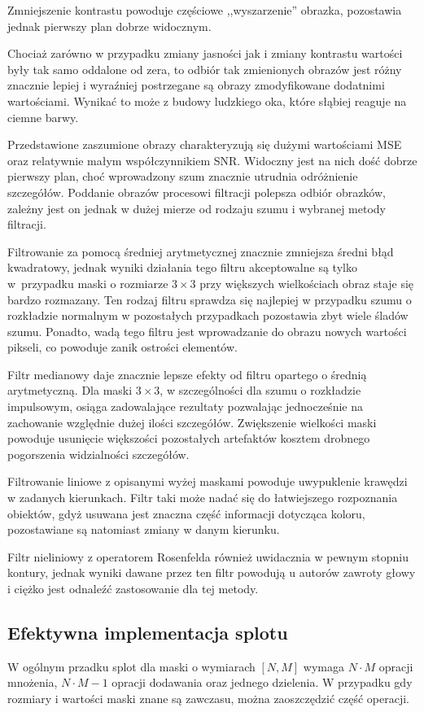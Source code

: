 \documentclass{classrep}
\begin{document}
Zmniejszenie kontrastu powoduje częściowe ,,wyszarzenie'' obrazka, pozostawia jednak pierwszy plan dobrze widocznym.

Chociaż zarówno w przypadku zmiany jasności jak i zmiany kontrastu wartości były tak samo oddalone od zera, to odbiór tak zmienionych obrazów jest różny \ppauza znacznie lepiej i wyraźniej postrzegane są obrazy zmodyfikowane dodatnimi wartościami. Wynikać to może z budowy ludzkiego oka, które słąbiej reaguje na ciemne barwy.

Przedstawione zaszumione obrazy charakteryzują się dużymi wartościami MSE oraz relatywnie małym współczynnikiem SNR. Widoczny jest na nich dość dobrze pierwszy plan, choć wprowadzony szum znacznie utrudnia odróżnienie szczegółów. Poddanie obrazów procesowi filtracji polepsza odbiór obrazków, zależny jest on jednak w dużej mierze od rodzaju szumu i wybranej metody filtracji.

Filtrowanie za pomocą średniej arytmetycznej znacznie zmniejsza średni błąd kwadratowy, jednak wyniki działania tego filtru akceptowalne są tylko w~przypadku maski o rozmiarze $3 \times 3$ \ppauza przy większych wielkościach obraz staje się bardzo rozmazany. Ten rodzaj filtru sprawdza się najlepiej w przypadku szumu o rozkładzie normalnym \ppauza w pozostałych przypadkach pozostawia zbyt wiele śladów szumu. Ponadto, wadą tego filtru jest wprowadzanie do obrazu nowych wartości pikseli, co powoduje zanik ostrości elementów.

Filtr medianowy daje znacznie lepsze efekty od filtru opartego o średnią arytmetyczną. Dla maski $3 \times 3$, w szczególności dla szumu o rozkładzie impulsowym, osiąga zadowalające rezultaty pozwalając jednocześnie na zachowanie względnie dużej ilości szczegółów. Zwiększenie wielkości maski powoduje usunięcie większości pozostałych artefaktów kosztem drobnego pogorszenia widzialności szczegółów.

Filtrowanie liniowe z opisanymi wyżej maskami powoduje uwypuklenie krawędzi w zadanych kierunkach. Filtr taki może nadać się do łatwiejszego rozpoznania obiektów, gdyż usuwana jest znaczna część informacji dotycząca koloru, pozostawiane są natomiast zmiany w danym kierunku.

Filtr nieliniowy z operatorem Rosenfelda również uwidacznia \ppauza w pewnym stopniu \ppauza kontury, jednak wyniki dawane przez ten filtr powodują u autorów zawroty głowy i ciężko jest odnaleźć zastosowanie dla tej metody.

\subsection{Efektywna implementacja splotu}
W ogólnym przadku splot dla maski o wymiarach $[N, M]$ wymaga $N \cdot M$ opracji mnożenia, $N \cdot M - 1$ opracji dodawania oraz jednego dzielenia. W przypadku gdy rozmiary i wartości maski znane są zawczasu, można zaoszczędzić część operacji.
\end{document}
